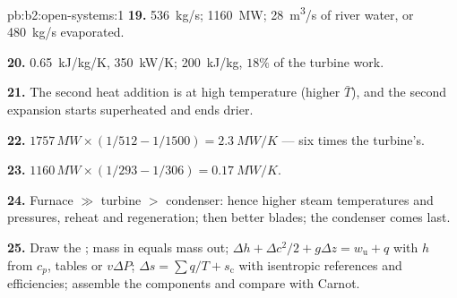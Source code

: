 \begin{solution}{pb:b2:open-systems:1}
\textbf{19.} \qty{536}{kg/s}; \qty{1160}{MW}; \qty{28}{m^3/s} of river water,
or \qty{480}{kg/s} evaporated.

\textbf{20.} \qty{0.65}{kJ/kg/K}, \qty{350}{kW/K}; \qty{200}{kJ/kg}, $18\%$ of the
turbine work.

\textbf{21.} The second heat addition is at high temperature (higher
$\bar T$), and the second expansion starts superheated and ends drier.

\textbf{22.} $1757\,\unit{MW} \times (1/512 - 1/1500) = \qty{2.3}{MW/K}$ --- six times
the turbine's.

\textbf{23.} $1160\,\unit{MW} \times (1/293 - 1/306) = \qty{0.17}{MW/K}$.

\textbf{24.} Furnace $\gg$ turbine $>$ condenser: hence higher steam
temperatures and pressures, reheat and regeneration; then better
blades; the condenser comes last.

\textbf{25.} Draw the ; mass in equals mass out; $\Delta h +
\Delta c^2/2 + g\Delta z = w_{\text{u}} + q$ with $h$ from $c_p$, tables or
$v\Delta P$; $\Delta s = \sum q/T + s_{\text{c}}$ with isentropic references and
efficiencies; assemble the components and compare with Carnot.
\end{solution}
